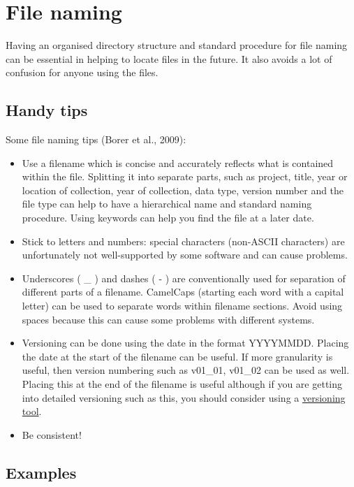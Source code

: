 \documentclass[a4paper,oneside]{report}
\providecommand{\tightlist}{%
  \setlength{\itemsep}{0pt}\setlength{\parskip}{0pt}}
\begin{document}
\hypertarget{file-naming}{%
\chapter{File naming}\label{file-naming}}

Having an organised directory structure and standard procedure for file
naming can be essential in helping to locate files in the future. It
also avoids a lot of confusion for anyone using the files.

\hypertarget{handy-tips-1}{%
\section{Handy tips}\label{handy-tips-1}}

Some file naming tips (Borer et al., 2009):

\begin{itemize}
\tightlist
\item
  Use a filename which is concise and accurately reflects what is
  contained within the file. Splitting it into separate parts, such as
  project, title, year or location of collection, year of collection,
  data type, version number and the file type can help to have a
  hierarchical name and standard naming procedure. Using keywords can
  help you find the file at a later date.
\item
  Stick to letters and numbers: special characters (non-ASCII
  characters) are unfortunately not well-supported by some software and
  can cause problems.
\item
  Underscores ( \_ ) and dashes ( - ) are conventionally used for
  separation of different parts of a filename. CamelCaps (starting each
  word with a capital letter) can be used to separate words within
  filename sections. Avoid using spaces because this can cause some
  problems with different systems.
\item
  Versioning can be done using the date in the format YYYYMMDD. Placing
  the date at the start of the filename can be useful. If more
  granularity is useful, then version numbering such as v01\_01, v01\_02
  can be used as well. Placing this at the end of the filename is useful
  although if you are getting into detailed versioning such as this, you
  should consider using a
  \protect\hyperlink{working-on-your-data}{versioning tool}.
\item
  Be consistent!
\end{itemize}

\hypertarget{examples}{%
\section{Examples}\label{examples}}
\end{document}
